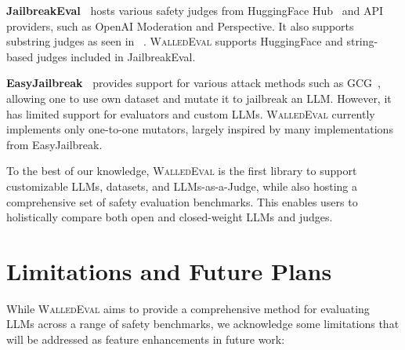 \documentclass[11pt]{article}
\newcommand{\tool}{\textsc{WalledEval}}
\begin{document}
\textbf{JailbreakEval~\cite{ran2024jailbreakeval}} hosts various safety judges from HuggingFace Hub~\cite{wolf2019huggingface} and API providers, such as OpenAI Moderation and Perspective. It also supports substring judges as seen in ~\citet{zou2023universal}. \tool{} supports HuggingFace and string-based judges included in JailbreakEval.

\textbf{EasyJailbreak~\cite{zhou2024easyjailbreak}} provides support for various attack methods such as GCG~\cite{zou2023universal}, allowing one to use own dataset and mutate it to jailbreak an LLM. However, it has limited support for evaluators and custom LLMs. \tool{} currently implements only one-to-one mutators, largely inspired by many implementations from EasyJailbreak.

To the best of our knowledge, \tool{} is the first library to support customizable LLMs, datasets, and LLMs-as-a-Judge, while also hosting a comprehensive set of safety evaluation benchmarks. This enables users to holistically compare both open and closed-weight LLMs and judges.


\section{Limitations and Future Plans}


While \tool{} aims to provide a comprehensive method for evaluating LLMs across a range of safety benchmarks, we acknowledge some limitations that will be addressed as feature enhancements in future work:
\end{document}
